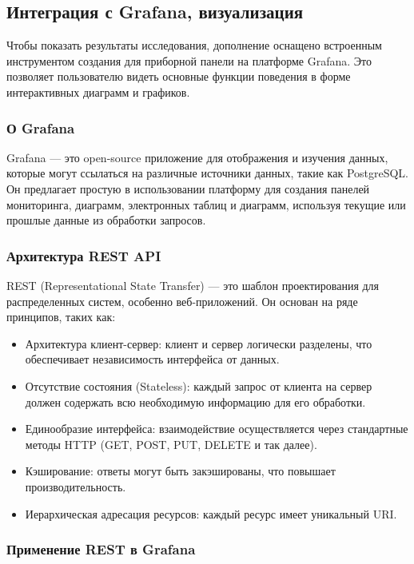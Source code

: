 \documentclass[14pt]{extarticle}
\begin{document}
\subsection{Интеграция с Grafana, визуализация}

Чтобы показать результаты исследования, дополнение оснащено встроенным инструментом создания для приборной панели на платформе Grafana. Это позволяет пользователю видеть основные функции поведения в форме интерактивных диаграмм и графиков.

\subsubsection*{О Grafana}

Grafana — это open-source приложение для отображения и изучения данных, которые могут ссылаться на различные источники данных, такие как PostgreSQL. Он предлагает простую в использовании платформу для создания панелей мониторинга, диаграмм, электронных таблиц и диаграмм, используя текущие или прошлые данные из обработки запросов.

\subsubsection*{Архитектура REST API}

REST (Representational State Transfer) — это шаблон проектирования для распределенных систем, особенно веб-приложений.  
Он основан на ряде принципов, таких как:

\begin{itemize}
  \item Архитектура клиент-сервер: клиент и сервер логически разделены, что обеспечивает независимость интерфейса от данных.
  \item Отсутствие состояния (Stateless): каждый запрос от клиента на сервер должен содержать всю необходимую информацию для его обработки.
  \item Единообразие интерфейса: взаимодействие осуществляется через стандартные методы HTTP (GET, POST, PUT, DELETE и так далее).
  \item Кэширование: ответы могут быть закэшированы, что повышает производительность.
  \item Иерархическая адресация ресурсов: каждый ресурс имеет уникальный URI.
\end{itemize}

\subsubsection*{Применение REST в Grafana}
\end{document}

